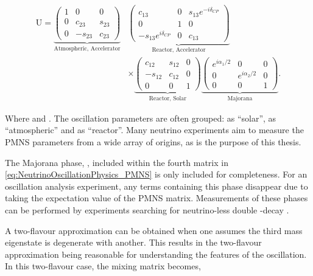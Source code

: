 \begin{equation}
  \label{eq:NeutrinoOscillationPhysics_PMNS}
  \begin{split}
  \mathrm{U} =
  \underbrace{\begin{pmatrix} 1 & 0 & 0 \\ 0 & c_{23} & s_{23} \\ 0 & -s_{23} & c_{23} \end{pmatrix}}_{\text{Atmospheric, Accelerator}} &
  \underbrace{\begin{pmatrix} c_{13} & 0 & s_{13}e^{-i \delta_{CP}} \\ 0 & 1 & 0 \\ -s_{13}e^{i \delta_{CP}} & 0 & c_{13} \end{pmatrix}}_{\text{Reactor, Accelerator}} \\
  & \times \underbrace{\begin{pmatrix} c_{12} & s_{12} & 0 \\ -s_{12} & c_{12} & 0 \\ 0 & 0 & 1 \end{pmatrix}}_{\text{Reactor, Solar}}
  \underbrace{\begin{pmatrix} e^{i\alpha_{1}/2} & 0 & 0 \\ 0 & e^{i\alpha_{2}/2} & 0 \\ 0 & 0 & 1 \end{pmatrix}}_{\text{Majorana}}.
  \end{split}
\end{equation}

Where  and . The oscillation parameters are often grouped:  as ``solar'',  as ``atmospheric'' and  as ``reactor''. Many neutrino experiments aim to measure the PMNS parameters from a wide array of origins, as is the purpose of this thesis.

The Majorana phase, , included within the fourth matrix in \autoref{eq:NeutrinoOscillationPhysics_PMNS} is only included for completeness. For an oscillation analysis experiment, any terms containing this phase disappear due to taking the expectation value of the PMNS matrix. Measurements of these phases can be performed by experiments searching for neutrino-less double \quickmath{\beta}-decay \cite{Maio_2015}.

A two-flavour approximation can be obtained when one assumes the third mass eigenstate is degenerate with another. This results in the two-flavour approximation being reasonable for understanding the features of the oscillation. In this two-flavour case, the mixing matrix becomes,

